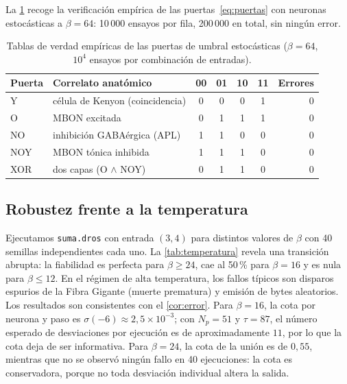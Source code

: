 \documentclass[11pt,a4paper]{article}
\theoremstyle{plain}
\theoremstyle{definition}
\theoremstyle{remark}
\newcommand{\sig}{\sigma}
\begin{document}
La \cref{tab:puertas} recoge la verificación empírica de las
puertas~\eqref{eq:puertas} con neuronas estocásticas a $\beta=64$: 10\,000
ensayos por fila, 200\,000 en total, sin ningún error.

\begin{table}[t]
\centering
\caption{Tablas de verdad empíricas de las puertas de umbral estocásticas
($\beta=64$, $10^4$ ensayos por combinación de entradas).}
\label{tab:puertas}
\small
\begin{tabular}{@{}llccccr@{}}
\toprule
Puerta & Correlato anatómico & 00 & 01 & 10 & 11 & Errores \\
\midrule
Y    & célula de Kenyon (coincidencia)  & 0 & 0 & 0 & 1 & 0 \\
O    & MBON excitada                    & 0 & 1 & 1 & 1 & 0 \\
NO   & inhibición GABAérgica (APL)      & 1 & 1 & 0 & 0 & 0 \\
NOY  & MBON tónica inhibida             & 1 & 1 & 1 & 0 & 0 \\
XOR  & dos capas (O $\wedge$ NOY)       & 0 & 1 & 1 & 0 & 0 \\
\bottomrule
\end{tabular}
\end{table}

\subsection{Robustez frente a la temperatura}

Ejecutamos \texttt{suma.dros} con entrada $(3,4)$ para distintos valores de
$\beta$ con 40 semillas independientes cada uno. La \cref{tab:temperatura}
revela una transición abrupta: la fiabilidad es perfecta para $\beta\ge24$,
cae al 50\,\% para $\beta=16$ y es nula para $\beta\le12$. En el régimen de
alta temperatura, los fallos típicos son disparos espurios de la Fibra
Gigante (muerte prematura) y emisión de bytes aleatorios. Los resultados son
consistentes con el \cref{cor:error}. Para $\beta=16$, la cota por neurona y
paso es $\sig(-6)\approx2{,}5\times10^{-3}$; con $N_p=51$ y $\tau=87$, el
número esperado de desviaciones por ejecución es de aproximadamente $11$,
por lo que la cota deja de ser informativa. Para $\beta=24$, la cota de la
unión es de $0{,}55$, mientras que no se observó ningún fallo en 40
ejecuciones: la cota es conservadora, porque no toda desviación individual
altera la salida.
\end{document}

